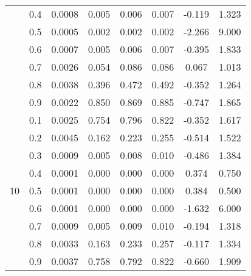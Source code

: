 \documentclass[11pt,a4paper]{report}
\begin{document}
\begin{longtable}{ | c | c || c | c | c | c | c | c | }
 & 0.4 & 0.0008 & 0.005 & 0.006 & 0.007 & -0.119 & 1.323 \\
 & 0.5 & 0.0005 & 0.002 & 0.002 & 0.002 & -2.266 & 9.000 \\
 & 0.6 & 0.0007 & 0.005 & 0.006 & 0.007 & -0.395 & 1.833 \\
 & 0.7 & 0.0026 & 0.054 & 0.086 & 0.086 & 0.067 & 1.013 \\
 & 0.8 & 0.0038 & 0.396 & 0.472 & 0.492 & -0.352 & 1.264 \\
 & 0.9 & 0.0022 & 0.850 & 0.869 & 0.885 & -0.747 & 1.865 \\
 \hline
\multirow{9}{*}{10} & 0.1 & 0.0025 & 0.754 & 0.796 & 0.822 & -0.352 & 1.617 \\
 & 0.2 & 0.0045 & 0.162 & 0.223 & 0.255 & -0.514 & 1.522 \\
 & 0.3 & 0.0009 & 0.005 & 0.008 & 0.010 & -0.486 & 1.384 \\
 & 0.4 & 0.0001 & 0.000 & 0.000 & 0.000 & 0.374 & 0.750 \\
 & 0.5 & 0.0001 & 0.000 & 0.000 & 0.000 & 0.384 & 0.500 \\
 & 0.6 & 0.0001 & 0.000 & 0.000 & 0.000 & -1.632 & 6.000 \\
 & 0.7 & 0.0009 & 0.005 & 0.009 & 0.010 & -0.194 & 1.318 \\
 & 0.8 & 0.0033 & 0.163 & 0.233 & 0.257 & -0.117 & 1.334 \\
 & 0.9 & 0.0037 & 0.758 & 0.792 & 0.822 & -0.660 & 1.909 \\
 \hline
\hline
\end{longtable}
\end{document}
